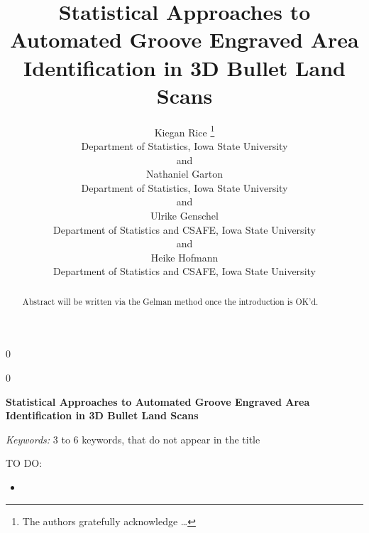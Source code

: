 \documentclass[12pt]{article}
\newcommand{\blind}{0}
\begin{document}
\def\spacingset#1{\renewcommand{\baselinestretch}%
{#1}\small\normalsize} \spacingset{1}




\blind
{
  \title{\bf Statistical Approaches to Automated Groove Engraved Area Identification
in 3D Bullet Land Scans}

  \author{
        Kiegan Rice \thanks{The authors gratefully acknowledge \ldots{}} \\
    Department of Statistics, Iowa State University\\
     and \\     Nathaniel Garton \\
    Department of Statistics, Iowa State University\\
     and \\     Ulrike Genschel \\
    Department of Statistics and CSAFE, Iowa State University\\
     and \\     Heike Hofmann \\
    Department of Statistics and CSAFE, Iowa State University\\
      }
  \maketitle
} \fi

\blind
{
  \bigskip
  \bigskip
  \bigskip
  \begin{center}
    {\LARGE\bf Statistical Approaches to Automated Groove Engraved Area Identification
in 3D Bullet Land Scans}
  \end{center}
  \medskip
} \fi

\bigskip
\begin{abstract}
Abstract will be written via the Gelman method once the introduction is
OK'd.
\end{abstract}

\noindent%
{\it Keywords:} 3 to 6 keywords, that do not appear in the title
\vfill

\newpage
\spacingset{1.45} %

\newcommand{\hh}[1]{{\color{orange}{#1}}}
\newcommand{\kr}[1]{{\color{teal}{#1}}}
\newcommand{\ug}[1]{{\color{purple}{#1}}}
\newcommand{\nate}[1]{{\color{olive}{#1}}}

TO DO:

\begin{itemize}
\item
  {\color{teal}{Abstract}}
\end{itemize}
\end{document}
